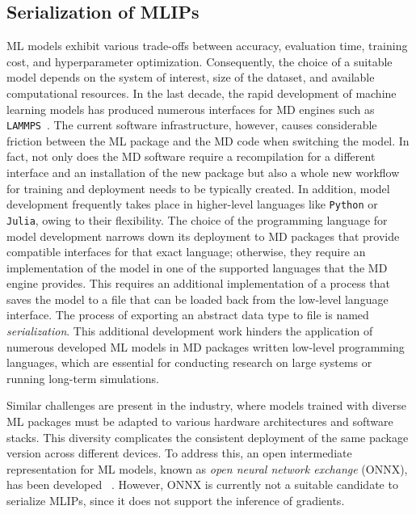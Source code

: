 \subsection{Serialization of MLIPs}
ML models exhibit various trade-offs between accuracy, evaluation time, training cost, and hyperparameter optimization.
Consequently, the choice of a suitable model depends on the system of interest, size of the dataset, and available computational resources.
In the last decade, the rapid development of machine learning models has produced numerous interfaces for MD engines such as \texttt{LAMMPS}~\cite{lammpsmliap,lammpsmlpace,lammpsmlpod,lammpsmlquip,lammpsmlhdnnp}.
The current software infrastructure, however, causes considerable friction between the ML package and the MD code when switching the model.
In fact, not only does the MD software require a recompilation for a different interface and an installation of the new package but also a whole new workflow for training and deployment needs to be typically created.
In addition, model development frequently takes place in higher-level languages like \texttt{Python} or \texttt{Julia}, owing to their flexibility.
The choice of the programming language for model development narrows down its deployment to MD packages that provide compatible interfaces for that exact language; otherwise, they require an implementation of the model in one of the supported languages that the MD engine provides.
This requires an additional implementation of a process that saves the model to a file that can be loaded back from the low-level language interface.
The process of exporting an abstract data type to file is named \emph{serialization}.
This additional development work hinders the application of numerous developed ML models in MD packages written low-level programming languages, which are essential for conducting research on large systems or running long-term simulations.

Similar challenges are present in the industry, where models trained with diverse ML packages must be adapted to various hardware architectures and software stacks.
This diversity complicates the consistent deployment of the same package version across different devices.
To address this, an open intermediate representation for ML models, known as \emph{open neural network exchange} (ONNX), has been developed ~\cite{bai2019}.
However, ONNX is currently not a suitable candidate to serialize MLIPs, since it does not support the inference of gradients.

